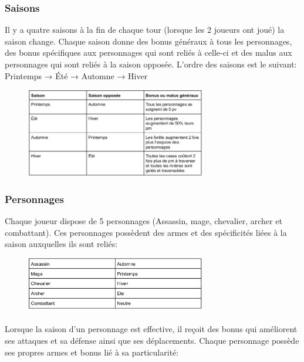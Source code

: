 \documentclass[a4paper,12pt]{article}
\begin{document}
\subsubsection{Saisons}
Il y a quatre saisons à la fin de chaque tour (lorsque les 2 joueurs ont joué) la saison change. Chaque saison donne des bonus généraux à tous les personnages, des bonus spécifiques aux personnages qui sont reliés à celle-ci et des malus aux personnages qui sont reliés à la saison opposée. L’ordre des saisons est le suivant: Printemps → Été → Automne → Hiver
\begin{figure}[ht]
\begin{center}
\includegraphics[width=0.7\textwidth]{tableausaison.png}
\end{center}
\end{figure}
\subsubsection{Personnages}
Chaque joueur dispose de 5 personnages (Assassin, mage, chevalier, archer et combattant). Ces personnages possèdent des armes et des spécificités liées à la saison auxquelles ils sont reliés:
\begin{figure}[ht]
\begin{center}
\includegraphics[width=0.7\textwidth]{tableaupersonnages.png}
\end{center}
\end{figure}
\paragraph{}
Lorsque la saison d’un personnage est effective, il reçoit des bonus  qui améliorent ses attaques et sa défense ainsi que ses déplacements.
Chaque personnage possède ses propres armes et bonus lié à sa particularité:
\end{document}

